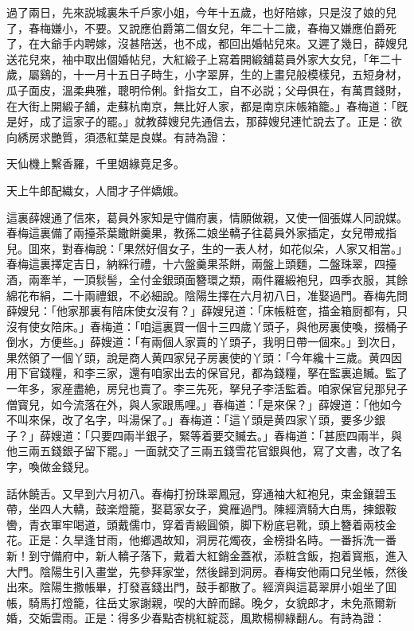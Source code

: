 過了兩日，先來説城裏朱千戶家小姐，今年十五歲，也好陪嫁，只是沒了娘的兒了，春梅嫌小，不要。又說應伯爵第二個女兒，年二十二歲，春梅又嫌應伯爵死了，在大爺手内聘嫁，沒甚陪送，也不成，都回出婚帖兒來。又遲了幾日，薛嫂兒送花兒來，袖中取出個婚帖兒，大紅緞子上寫着開緞舖葛員外家大女兒，「年二十歲，屬鷄的，十一月十五日子時生，小字翠屏，生的上畫兒般模樣兒，五短身材，瓜子面皮，溫柔典雅，聰明伶俐。針指女工，自不必説；父母俱在，有萬貫錢財，在大街上開緞子舖，走蘇杭南京，無比好人家，都是南京床帳箱籠。」春梅道：「旣是好，成了這家子的罷。」就教薛嫂兒先通信去，那薛嫂兒連忙說去了。正是：欲向綉房求艷質，須憑紅葉是良媒。有詩為證：

\begin{myquote}
天仙機上繫香羅，千里姻緣竟足多。

天上牛郎配織女，人間才子伴嬌娥。
\end{myquote}

這裏薛嫂通了信來，葛員外家知是守備府裏，情願做親，又使一個張媒人同說媒。春梅這裏備了兩擡茶葉饊餅羹果，教孫二娘坐轎子往葛員外家插定，女兒帶戒指兒。囬來，對春梅說：「果然好個女子，生的一表人材，如花似朵，人家又相當。」春梅這裏擇定吉日，納綵行禮，十六盤羹果茶餅，兩盤上頭麵，二盤珠翠，四擡酒，兩牽羊，一頂䯼髻，全付金銀頭面簪環之類，兩件羅緞袍兒，四季衣服，其餘綿花布絹，二十兩禮銀，不必細說。陰陽生擇在六月初八日，准娶過門。春梅先問薛嫂兒：「他家那裏有陪床使女沒有？」薛嫂兒道：「床帳粧奩，描金箱厨都有，只沒有使女陪床。」春梅道：「咱這裏買一個十三四歲丫頭子，與他房裏使喚，掇桶子倒水，方便些。」薛嫂道：「有兩個人家賣的丫頭子，我明日帶一個來。」到次日，果然領了一個丫頭，說是商人黄四家兒子房裏使的丫頭：「今年纔十三歲。黄四因用下官錢糧，和李三家，還有咱家出去的保官兒，都為錢糧，拏在監裏追贓。監了一年多，家産盡絶，房兒也賣了。李三先死，拏兒子李活監着。咱家保官兒那兒子僧寳兒，如今流落在外，與人家跟馬哩。」春梅道：「是來保？」薛嫂道：「他如今不叫來保，改了名字，呌湯保了。」春梅道：「這丫頭是黄四家丫頭，要多少銀子？」薛嫂道：「只要四兩半銀子，緊等着要交贓去。」春梅道：「甚麽四兩半，與他三兩五錢銀子留下罷。」一面就交了三兩五錢雪花官銀與他，寫了文書，改了名字，喚做金錢兒。

話休饒舌。又早到六月初八。春梅打扮珠翠鳳冠，穿通袖大紅袍兒，束金鑲碧玉帶，坐四人大轎，鼓楽燈籠，娶葛家女子，奠雁過門。陳經濟騎大白馬，揀銀鞍轡，青衣軍牢喝道，頭戴儒巾，穿着青緞圓領，脚下粉底皂靴，頭上簪着兩枝金花。正是：久旱逢甘雨，他鄉遇故知，洞房花燭夜，金榜掛名時。一番拆洗一番新！到守備府中，新人轎子落下，戴着大紅銷金蓋袱，添粧含飯，抱着寳瓶，進入大門。陰陽生引入畫堂，先參拜家堂，然後歸到洞房。春梅安他兩口兒坐帳，然後出來。陰陽生撒帳畢，打發喜錢出門，鼓手都散了。經濟與這葛翠屏小姐坐了囬帳，騎馬打燈籠，往岳丈家謝親，喫的大醉而歸。晚夕，女貌郎才，未免燕爾新婚，交姤雲雨。正是：得多少春點杏桃紅綻蕊，風欺楊柳綠翻ん。有詩為證：

